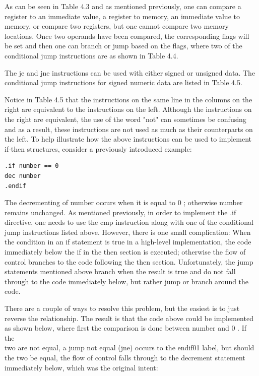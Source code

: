 \documentclass[10pt]{article}
\begin{document}
As can be seen in Table 4.3 and as mentioned previously, one can compare a register to an immediate value, a register to memory, an immediate value to memory, or compare two registers, but one cannot compare two memory locations. Once two operands have been compared, the corresponding flags will be set and then one can branch or jump based on the flags, where two of the conditional jump instructions are as shown in Table 4.4.

The je and jne instructions can be used with either signed or unsigned data. The conditional jump instructions for signed numeric data are listed in Table 4.5.

Notice in Table 4.5 that the instructions on the same line in the columns on the right are equivalent to the instructions on the left. Although the instructions on the right are equivalent, the use of the word "not" can sometimes be confusing and as a result, these instructions are not used as much as their counterparts on the left. To help illustrate how the above instructions can be used to implement if-then structures, consider a previously introduced example:

\begin{verbatim}
.if number == 0
dec number
.endif
\end{verbatim}

The decrementing of number occurs when it is equal to 0 ; otherwise number remains unchanged. As mentioned previously, in order to implement the .if directive, one needs to use the cmp instruction along with one of the conditional jump instructions listed above. However, there is one small complication: When the condition in an if statement is true in a high-level implementation, the code immediately below the if in the then section is executed; otherwise the flow of control branches to the code following the then section. Unfortunately, the jump statements mentioned above branch when the result is true and do not fall through to the code immediately below, but rather jump or branch around the code.

There are a couple of ways to resolve this problem, but the easiest is to just reverse the relationship. The result is that the code above could be implemented as shown below, where first the comparison is done between number and 0 . If the\\
two are not equal, a jump not equal (jne) occurs to the endif01 label, but should the two be equal, the flow of control falls through to the decrement statement immediately below, which was the original intent:
\end{document}
